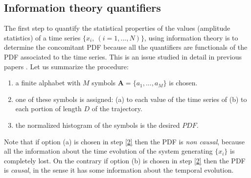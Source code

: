 \subsection{Information theory quantifiers}\label{sec:quant}
The first step to quantify the statistical properties of the values (amplitude statistics) of a time series $\{x_i,~(i=1,...,N)\}$, using information theory is to determine the concomitant PDF because all the quantifiers are functionals of the PDF associated to the time series. This is an issue studied in detail in previous papers \cite{aka varios}. Let us summarize the procedure:
\begin{enumerate} 
\item \label{1} a finite alphabet  with $M$ symbols $\mathbf{ A}=\{a_1,...,a_M\}$ is chosen. 
\item \label{2} one of these symbols is assigned: (a) to each value of the time series of (b) to each portion of length $D$ of the trajectory. 
\item \label{3} the normalized histogram of the symbols is the desired $PDF$.
\end{enumerate}

Note that if option (a) is chosen in step \ref{2} then the PDF is \emph{non causal}, because all the information about the time evolution of the system generating $\{x_i\}$  is completely lost. On the contrary if option (b) is chosen in step \ref{2} then the PDF is \emph{causal}, in the sense it has some information about the temporal evolution.

